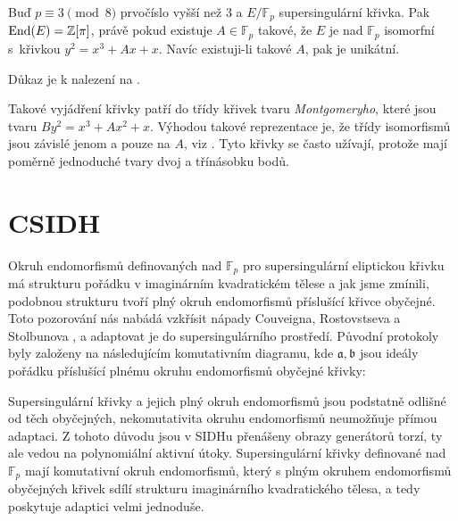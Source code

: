 \documentclass[12pt]{report}
\begin{document}
\begin{veta}\label{YO}
Buď $p \equiv 3 \pmod{8}$ prvočíslo vyšší než $3$ a $E/\mathbb{F}_p$ supersingulární křivka. Pak $\operatorname{End}(E) = \mathbb{Z}[\pi]$, právě pokud existuje $A \in \mathbb{F}_p$ takové, že $E$ je nad $\mathbb{F}_p$ isomorfní s~křivkou $y^2 = x^3 + Ax + x$. Navíc existuji-li takové $A$, pak je unikátní.
\end{veta}
Důkaz je k nalezení na \cite[Prop. 8.]{CSIDH}.

Takové vyjádření křivky patří do třídy křivek tvaru \textit{Montgomeryho}, které jsou tvaru $B y^2 = x^3 + Ax^2 + x$. Výhodou takové reprezentace je, že třídy isomorfismů jsou závislé jenom a pouze na $A$, viz \cite[Lemma 29.]{Karaskova}. Tyto křivky se často užívají, protože mají poměrně jednoduché tvary dvoj a třínásobku bodů.

\section{CSIDH}

Okruh endomorfismů definovaných nad $\mathbb{F}_p$ pro supersingulární eliptickou křivku má strukturu pořádku v imaginárním kvadratickém tělese a jak jsme zmínili, podobnou strukturu tvoří plný okruh endomorfismů příslušící křivce obyčejné. Toto pozorování nás nabádá vzkřísit nápady Couveigna, Rostovstseva a Stolbunova \cite{Couveignes}, \cite{Stolbunov} a adaptovat je do supersingulárního prostředí. Původní protokoly byly založeny na následujícím komutativním diagramu, kde $\mathfrak{a},\mathfrak{b}$ jsou ideály pořádku příslušící plnému okruhu endomorfismů obyčejné křivky:

\begin{figure}[h]
\begin{center} 
\end{center}
\end{figure}

Supersingulární křivky a jejich plný okruh endomorfismů jsou podstatně odlišné od těch obyčejných, nekomutativita okruhu endomorfismů neumožňuje přímou adaptaci. Z tohoto důvodu jsou v SIDHu přenášeny obrazy generátorů torzí, ty ale vedou na polynomiální aktivní útoky. Supersingulární křivky definované nad $\mathbb{F}_p$ mají komutativní okruh endomorfismů, který s plným okruhem endomorfismů obyčejných křivek sdílí strukturu imaginárního kvadratického tělesa, a tedy poskytuje adaptici velmi jednoduše. 
\end{document}
